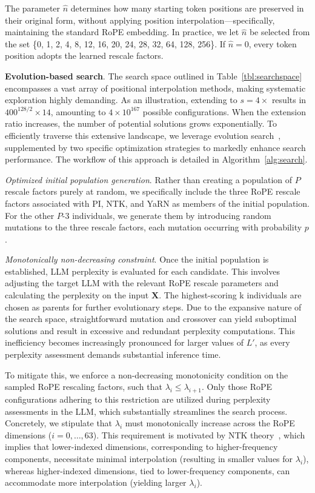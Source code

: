 The parameter $\hat{n}$ determines how many starting token positions are preserved in their original form, without applying position interpolation—specifically, maintaining the standard RoPE embedding. In practice, we let $\hat{n}$ be selected from the set \{0, 1, 2, 4, 8, 12, 16, 20, 24, 28, 32, 64, 128, 256\}. If $\hat{n}=0$, every token position adopts the learned rescale factors.

\textbf{Evolution-based search}. The search space outlined in Table~\ref{tbl:searchspace} encompasses a vast array of positional interpolation methods, making systematic exploration highly demanding. As an illustration, extending to $s=4\times$ results in $400^{128/2}\times14$, amounting to $4\times10^{167}$ possible configurations. When the extension ratio increases, the number of potential solutions grows exponentially. To efficiently traverse this extensive landscape, we leverage evolution search~\cite{guo2020single}, supplemented by two specific optimization strategies to markedly enhance search performance. The workflow of this approach is detailed in Algorithm~\ref{alg:search}.

\textit{Optimized initial population generation}. Rather than creating a population of $P$ rescale factors purely at random, we specifically include the three RoPE rescale factors associated with PI, NTK, and YaRN as members of the initial population. For the other $P$-3 individuals, we generate them by introducing random mutations to the three rescale factors, each mutation occurring with probability $p$.

\textit{Monotonically non-decreasing constraint}. Once the initial population is established, LLM perplexity is evaluated for each candidate. This involves adjusting the target LLM with the relevant RoPE rescale parameters and calculating the perplexity on the input $\mathbf{X}$. The highest-scoring k individuals are chosen as parents for further evolutionary steps. Due to the expansive nature of the search space, straightforward mutation and crossover can yield suboptimal solutions and result in excessive and redundant perplexity computations. This inefficiency becomes increasingly pronounced for larger values of $L'$, as every perplexity assessment demands substantial inference time.

To mitigate this, we enforce a non-decreasing monotonicity condition on the sampled RoPE rescaling factors, such that $\lambda_i \leq \lambda_{i+1}$. Only those RoPE configurations adhering to this restriction are utilized during perplexity assessments in the LLM, which substantially streamlines the search process. Concretely, we stipulate that $\lambda_i$ must monotonically increase across the RoPE dimensions ($i = 0, \ldots, 63$). This requirement is motivated by NTK theory~\cite{jacot2018neural,tancik2020fourier,ntk}, which implies that lower-indexed dimensions, corresponding to higher-frequency components, necessitate minimal interpolation (resulting in smaller values for $\lambda_i$), whereas higher-indexed dimensions, tied to lower-frequency components, can accommodate more interpolation (yielding larger $\lambda_i$).

